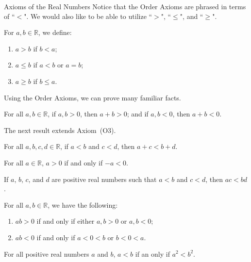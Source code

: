 \begin{section}{Axioms of the Real Numbers}
Notice that the Order Axioms are phrased in terms of ``$<$". We would also like to be able to utilize ``$>$", ``$\leq$", and ``$\geq$".

\begin{definition}
For $a,b\in\mathbb{R}$, we define:
\begin{enumerate}[label=\textrm{(\alph*)}]
\item $a>b$ if $b<a$;
\item $a\leq b$ if $a<b$ or $a=b$;
\item $a\geq b$ if $b\leq a$.
\end{enumerate}
\end{definition}

Using the Order Axioms, we can prove many familiar facts. 

\begin{theorem}
For all $a,b\in\mathbb{R}$, if $a,b>0$, then $a+b>0$; and if $a,b<0$, then $a+b<0$.
\end{theorem}

The next result extends Axiom~(O3).

\begin{theorem}
For all $a,b,c,d\in\mathbb{R}$, if $a<b$ and $c<d$, then $a+c<b+d$.
\end{theorem}

\begin{theorem}\label{thm:additive inverse of a positive is negative}
For all $a\in\mathbb{R}$, $a>0$ if and only if $-a<0$.
\end{theorem}

\begin{theorem}
If $a$, $b$, $c$, and $d$ are positive real numbers such that $a<b$ and $c<d$, then $ac<bd$.
\end{theorem}

\begin{theorem}
For all $a,b\in\mathbb{R}$, we have the following:
\begin{enumerate}[label=\textrm{(\alph*)}]
\item $ab>0$ if and only if either $a,b>0$ or $a,b<0$;
\item $ab<0$ if and only if $a<0<b$ or $b<0<a$.
\end{enumerate}
\end{theorem}

\begin{theorem}
For all positive real numbers $a$ and $b$, $a< b$ if an only if $a^2< b^2$.
\end{theorem}


\end{section}
